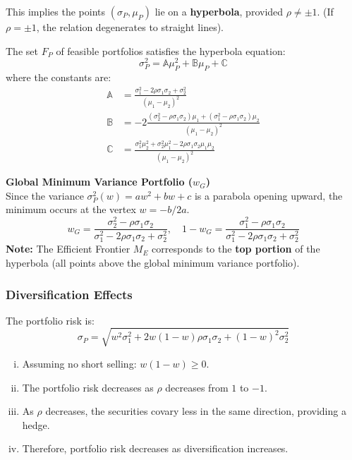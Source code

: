 \noindent This implies the points $(\sigma_P, \mu_P)$ lie on a \textbf{hyperbola}, provided $\rho \neq \pm 1$. (If $\rho = \pm 1$, the relation degenerates to straight lines).
\begin{framed}
    The set $F_P$ of feasible portfolios satisfies the hyperbola equation:
    \begin{equation*}
        \sigma_P^2 = \mathbb{A}\mu_P^2 + \mathbb{B}\mu_P + \mathbb{C}
    \end{equation*}
    where the constants are:
    \begin{align*}
        \mathbb{A} &= \frac{\sigma_1^2 - 2\rho \sigma_1 \sigma_2 + \sigma_2^2}{(\mu_1 - \mu_2)^2} \\
        \mathbb{B} &= -2\frac{(\sigma_2^2 - \rho \sigma_1 \sigma_2)\mu_1 + (\sigma_1^2 - \rho \sigma_1 \sigma_2)\mu_2}{(\mu_1 - \mu_2)^2} \\
        \mathbb{C} &= \frac{\sigma_1^2\mu_2^2 + \sigma_2^2\mu_1^2 - 2\rho \sigma_1 \sigma_2 \mu_1 \mu_2}{(\mu_1 - \mu_2)^2}
    \end{align*}
\end{framed}

\noindent \textbf{Global Minimum Variance Portfolio ($w_G$)} \\
Since the variance $\sigma_P^2(w) = aw^2 + bw + c$ is a parabola opening upward, the minimum occurs at the vertex $w = -b/2a$.
\begin{equation*}
    w_G = \frac{\sigma_2^2 - \rho \sigma_1 \sigma_2}{\sigma_1^2 - 2 \rho \sigma_1 \sigma_2 + \sigma_2^2}, \quad 1-w_G = \frac{\sigma_1^2 - \rho \sigma_1 \sigma_2}{\sigma_1^2 - 2\rho \sigma_1 \sigma_2 + \sigma_2^2}
\end{equation*}
\textbf{Note:} The Efficient Frontier $M_E$ corresponds to the \textbf{top portion} of the hyperbola (all points above the global minimum variance portfolio).

\subsubsection{Diversification Effects}
The portfolio risk is:
\begin{equation*}
    \sigma_P = \sqrt{w^2\sigma_1^2 + 2w(1-w)\rho \sigma_1 \sigma_2 + (1-w)^2 \sigma_2^2}
\end{equation*}
\begin{enumerate}[i.]
    \item Assuming no short selling: $w(1-w) \ge 0$.
    \item The portfolio risk decreases as $\rho$ decreases from $1$ to $-1$.
    \item As $\rho$ decreases, the securities covary less in the same direction, providing a hedge.
    \item Therefore, portfolio risk decreases as diversification increases.
\end{enumerate}


